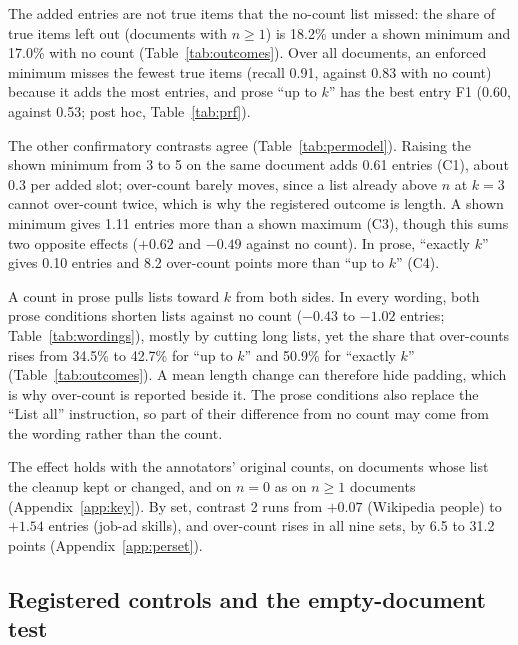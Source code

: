 The added entries are not true items that the no-count list missed: the share of true items left out (documents with $n \geq 1$) is 18.2\%\pre{} under a shown minimum and 17.0\%\pre{} with no count (Table~\ref{tab:outcomes}).
Over all documents, an enforced minimum misses the fewest true items (recall 0.91\pre{}, against 0.83\pre{} with no count) because it adds the most entries, and prose ``up to $k$'' has the best entry F1 (0.60\pre{}, against 0.53\pre{}; post hoc, Table~\ref{tab:prf}).

The other confirmatory contrasts agree (Table~\ref{tab:permodel}).
Raising the shown minimum from 3 to 5 on the same document adds 0.61 entries (C1), about 0.3 per added slot; over-count barely moves, since a list already above $n$ at $k = 3$ cannot over-count twice, which is why the registered outcome is length.
A shown minimum gives 1.11 entries more than a shown maximum (C3), though this sums two opposite effects ($+0.62$ and $-0.49$ against no count).
In prose, ``exactly $k$'' gives 0.10 entries and 8.2 over-count points more than ``up to $k$'' (C4).

A count in prose pulls lists toward $k$ from both sides.
In every wording, both prose conditions shorten lists against no count ($-0.43$ to $-1.02$ entries; Table~\ref{tab:wordings}), mostly by cutting long lists, yet the share that over-counts rises from 34.5\% to 42.7\% for ``up to $k$'' and 50.9\% for ``exactly $k$'' (Table~\ref{tab:outcomes}).
A mean length change can therefore hide padding, which is why over-count is reported beside it.
The prose conditions also replace the ``List all'' instruction, so part of their difference from no count may come from the wording rather than the count.

The effect holds with the annotators' original counts, on documents whose list the cleanup kept or changed, and on $n = 0$ as on $n \geq 1$ documents (Appendix~\ref{app:key}).
By set, contrast 2 runs from $+0.07$ (Wikipedia people) to $+1.54$ entries (job-ad skills), and over-count rises in all nine sets, by 6.5 to 31.2 points (Appendix~\ref{app:perset}).

\subsection{Registered controls and the empty-document test}
\label{sec:named}

